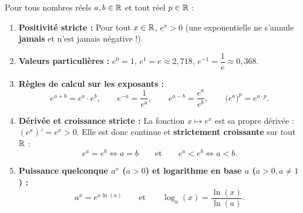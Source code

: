 \begin{theoreme}
Pour tous nombres réels $a, b \in \mathbb{R}$ et tout réel $p \in \mathbb{R}$ :
\begin{enumerate}
    \item \textbf{Positivité stricte :} Pour tout $x \in \mathbb{R}$, $\boxed{e^x > 0}$ (une exponentielle ne s'annule \textbf{jamais} et n'est jamais négative !).
    \item \textbf{Valeurs particulières :} $e^0 = 1$, \quad $e^1 = e \approx 2,718$, \quad $e^{-1} = \dfrac{1}{e} \approx 0,368$.
    \item \textbf{Règles de calcul sur les exposants :}
    \[
        \boxed{e^{a+b} = e^a \cdot e^b}, \qquad \boxed{e^{-a} = \frac{1}{e^a}}, \qquad \boxed{e^{a-b} = \frac{e^a}{e^b}}, \qquad \boxed{\bigl(e^a\bigr)^p = e^{a\cdot p}}.
    \]
    \item \textbf{Dérivée et croissance stricte :} La fonction $x \mapsto e^x$ est sa propre dérivée : $\boxed{(e^x)' = e^x > 0}$. Elle est donc continue et \textbf{strictement croissante} sur tout $\mathbb{R}$ :
    \[
        e^a = e^b \iff a = b \qquad \text{et} \qquad e^a < e^b \iff a < b.
    \]
    \item \textbf{Puissance quelconque $a^x$ ($a > 0$) et logarithme en base $a$ ($a > 0, a \neq 1$) :}
    \[
        \boxed{a^x = e^{x\ln(a)}} \qquad \text{et} \qquad \boxed{\log_a(x) = \frac{\ln(x)}{\ln(a)}}.
    \]
\end{enumerate}
\end{theoreme}

